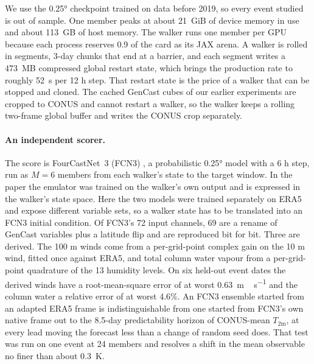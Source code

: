 \documentclass[10pt,twocolumn]{article}
\newcommand{\Tm}{T_{2\mathrm{m}}}
\begin{document}
We use the 0.25\si{\degree} checkpoint trained on data before 2019, so every event studied is out of sample. One member peaks at about \SI{21}{GiB} of device memory in use and about \SI{113}{GB} of host memory. The walker runs one member per GPU because each process reserves 0.9 of the card as its JAX arena. A walker is rolled in segments, 3-day chunks that end at a barrier, and each segment writes a \SI{473}{MB} compressed global restart state, which brings the production rate to roughly \SI{52}{s} per 12 h step. That restart state is the price of a walker that can be stopped and cloned. The cached GenCast cubes of our earlier experiments are cropped to CONUS and cannot restart a walker, so the walker keeps a rolling two-frame global buffer and writes the CONUS crop separately.

\paragraph{An independent scorer.}
The score is FourCastNet~3 (FCN3) \citep{bonev2025fcn3}, a probabilistic 0.25\si{\degree} model with a 6 h step, run as $M = 6$ members from each walker's state to the target window. In the paper the emulator was trained on the walker's own output and is expressed in the walker's state space. Here the two models were trained separately on ERA5 and expose different variable sets, so a walker state has to be translated into an FCN3 initial condition. Of FCN3's 72 input channels, 69 are a rename of GenCast variables plus a latitude flip and are reproduced bit for bit. Three are derived. The 100 m winds come from a per-grid-point complex gain on the 10 m wind, fitted once against ERA5, and total column water vapour from a per-grid-point quadrature of the 13 humidity levels. On six held-out event dates the derived winds have a root-mean-square error of at worst \SI{0.63}{m\,s^{-1}} and the column water a relative error of at worst 4.6\%. An FCN3 ensemble started from an adapted ERA5 frame is indistinguishable from one started from FCN3's own native frame out to the 8.5-day predictability horizon of CONUS-mean $\Tm$, at every lead moving the forecast less than a change of random seed does. That test was run on one event at 24 members and resolves a shift in the mean observable no finer than about \SI{0.3}{K}.
\end{document}
